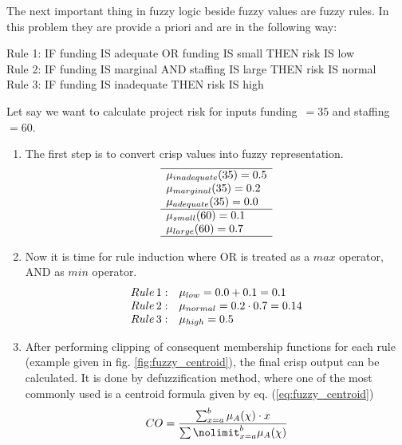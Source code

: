 The next important thing in fuzzy logic beside fuzzy values are fuzzy rules. In
this problem they are provide a priori and are in the following way:
\begin{table}[H]
    Rule 1: IF funding IS adequate OR funding IS small THEN risk IS
    low \\
    Rule 2: IF funding IS marginal AND staffing IS large THEN risk IS
    normal \\
    Rule 3: IF funding IS inadequate THEN risk IS high
\end{table}
Let say we want to calculate project risk for inputs funding~$=35$ and
staffing~$=60$. 
\begin{enumerate}
    \item The first step is to convert crisp values into fuzzy representation.
        $$
            \begin{array}[H]{l}
                \hline
                \mu_{inadequate}(35) = 0.5 \\
                \mu_{marginal}(35) = 0.2 \\
                \mu_{adequate}(35) = 0.0 \\ \hline
                \mu_{small}(60) = 0.1 \\
                \mu_{large}(60) = 0.7 \\ \hline
            \end{array}
        $$
    \item Now it is time for rule induction where OR is treated as a $max$ operator, AND
        as $min$ operator. 
        $$
            \begin{array}[H]{ll}
                Rule \,1: & \mu_{low} = 0.0 + 0.1 = 0.1 \\
                Rule \,2: & \mu_{normal} = 0.2\cdot 0.7 = 0.14 \\
                Rule \,3: & \mu_{high} = 0.5 \\
            \end{array}
        $$
    \item After performing clipping of consequent membership functions for each
        rule (example given in fig. \ref{fig:fuzzy_centroid}), the final crisp output can be calculated. It is done by
        defuzzification method, where one of the most commonly used is a centroid
        formula given by eq. (\ref{eq:fuzzy_centroid})
        \begin{equation}
            CO = \frac{\sum\nolimits_{x=a}^{b}\mu_A(\chi)\cdot
            x}{\sum\nolimit_{x=a}^{b}\mu_A(\chi)}
            \label{eq:fuzzy_centroid}

\end{equation}
\end{enumerate}
